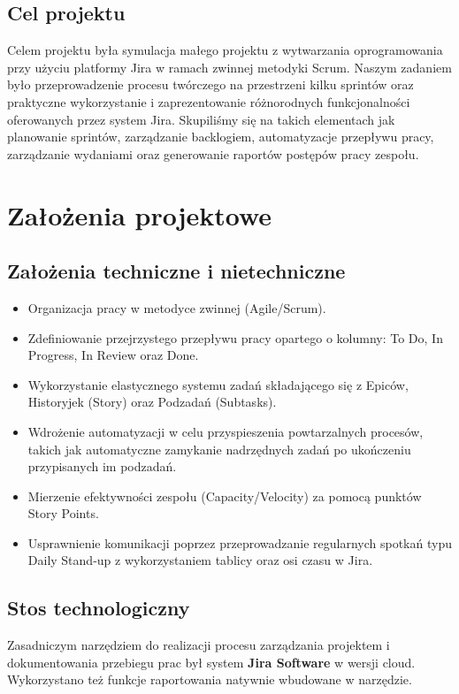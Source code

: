 \documentclass[12pt,a4paper]{article}
\begin{document}
\subsection{Cel projektu}
	Celem projektu była symulacja małego projektu z wytwarzania oprogramowania przy użyciu platformy Jira w ramach zwinnej metodyki Scrum. Naszym zadaniem było przeprowadzenie procesu twórczego na przestrzeni kilku sprintów oraz praktyczne wykorzystanie i zaprezentowanie różnorodnych funkcjonalności oferowanych przez system Jira. Skupiliśmy się na takich elementach jak planowanie sprintów, zarządzanie backlogiem, automatyzacje przepływu pracy, zarządzanie wydaniami oraz generowanie raportów postępów pracy zespołu.





\newpage
\section{Założenia projektowe}
\subsection{Założenia techniczne i nietechniczne}
	\begin{itemize}
		\item Organizacja pracy w metodyce zwinnej (Agile/Scrum).
		\item Zdefiniowanie przejrzystego przepływu pracy opartego o kolumny: To Do, In Progress, In Review oraz Done.
		\item Wykorzystanie elastycznego systemu zadań składającego się z Epiców, Historyjek (Story) oraz Podzadań (Subtasks).
		\item Wdrożenie automatyzacji w celu przyspieszenia powtarzalnych procesów, takich jak automatyczne zamykanie nadrzędnych zadań po ukończeniu przypisanych im podzadań.
		\item Mierzenie efektywności zespołu (Capacity/Velocity) za pomocą punktów Story Points.
		\item Usprawnienie komunikacji poprzez przeprowadzanie regularnych spotkań typu Daily Stand-up z wykorzystaniem tablicy oraz osi czasu w Jira.
	\end{itemize}

\subsection{Stos technologiczny}
	Zasadniczym narzędziem do realizacji procesu zarządzania projektem i dokumentowania przebiegu prac był system \textbf{Jira Software} w wersji cloud. Wykorzystano też funkcje raportowania natywnie wbudowane w narzędzie.
\end{document}
